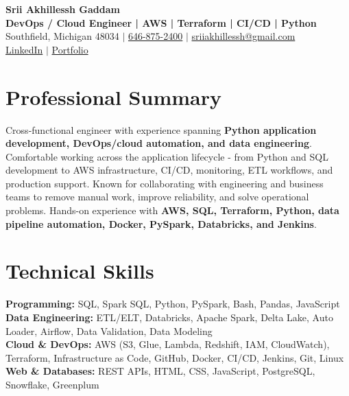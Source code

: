 \documentclass[letterpaper,10pt]{article}
\begin{document}
\fontsize{9.35pt}{10.45pt}\selectfont

\begin{center}
    {\LARGE \textbf{Srii Akhillessh Gaddam}} \\[-1pt]
    \textbf{DevOps / Cloud Engineer | AWS | Terraform | CI/CD | Python} \\[2pt]
    Southfield, Michigan 48034 $|$
    \href{tel:6468752400}{646-875-2400} $|$
    \href{mailto:sriiakhillessh@gmail.com}{sriiakhillessh@gmail.com} \\[1pt]
    \href{https://www.linkedin.com/in/srii-akhiilessh-gaddam-b48668191/}{LinkedIn} $|$
    \href{https://sriiakhillesshg.github.io/portfolio/}{Portfolio}
\end{center}
\vspace{-8pt}

\section{Professional Summary}
\small{Cross-functional engineer with experience spanning \textbf{Python application development, DevOps/cloud automation, and data engineering}. Comfortable working across the application lifecycle - from Python and SQL development to AWS infrastructure, CI/CD, monitoring, ETL workflows, and production support. Known for collaborating with engineering and business teams to remove manual work, improve reliability, and solve operational problems. Hands-on experience with \textbf{AWS, SQL, Terraform, Python, data pipeline automation, Docker, PySpark, Databricks, and Jenkins}.}

\section{Technical Skills}
\small{
\textbf{Programming:} SQL, Spark SQL, Python, PySpark, Bash, Pandas, JavaScript \\
\textbf{Data Engineering:} ETL/ELT, Databricks, Apache Spark, Delta Lake, Auto Loader, Airflow, Data Validation, Data Modeling \\
\textbf{Cloud \& DevOps:} AWS (S3, Glue, Lambda, Redshift, IAM, CloudWatch), Terraform, Infrastructure as Code, GitHub, Docker, CI/CD, Jenkins, Git, Linux \\
\textbf{Web \& Databases:} REST APIs, HTML, CSS, JavaScript, PostgreSQL, Snowflake, Greenplum
}
\end{document}
